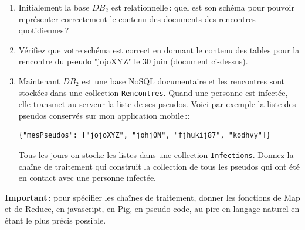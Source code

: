 \documentclass[11pt,a4paper]{article}
\begin{document}
\begin{enumerate}
    \item Initialement la base $DB_2$ est relationnelle\,: quel est son schéma pour pouvoir
    représenter correctement le contenu des documents des rencontres quotidiennes\,?
    
    \item Vérifiez que votre schéma est correct en donnant le contenu 
    des tables pour la rencontre du pseudo "jojoXYZ" le 30 juin (document ci-dessus).
 
    \item Maintenant $DB_2$ est une base NoSQL documentaire 
    et les rencontres sont stockées dans une collection \texttt{Rencontres}. 
     Quand une personne est infectée, elle transmet au
         serveur la liste de ses pseudos. Voici par exemple la liste
des pseudos conservés sur mon application mobile\,::

\begin{small}
\begin{verbatim}
{"mesPseudos": ["jojoXYZ", "johj0N", "fjhukij87", "kodhvy"]}
\end{verbatim}
\end{small}

      Tous les jours on stocke les listes dans une collection \texttt{Infections}.
         Donnez la chaîne de traitement qui construit la collection de tous les pseudos qui ont
         été en contact avec une personne infectée. 
\end{enumerate}

\textbf{Important}\,: pour spécifier les chaînes de traitement, 
donner les fonctions de Map et de 
Reduce, en javascript, en Pig, 
en pseudo-code, au pire en langage naturel en étant le plus précis possible.
\end{document}
